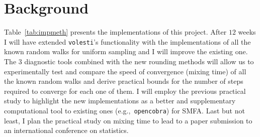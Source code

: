 \documentclass[a4paper, 12pt]{article}
\def\volesti{{\tt volesti}}
\begin{document}














\section{Background}

Table~\ref{tab:impmeth} presents the implementations of this project. After $12$ weeks I will have extended \volesti's functionality with the implementations of all the known random walks for uniform sampling and I will improve the existing one. The $3$ diagnostic tools combined with the new rounding methods will allow us to experimentally test and compare the speed of convergence (mixing time) of all the known random walks and derive practical bounds for the number of steps required to converge for each one of them. I will employ the previous practical study to highlight the new implementations as a better and supplementary computational tool to existing ones (e.g.,\ {\tt opencobra}) for SMFA. Last but not least, I plan the practical study on mixing time to lead to a paper submission to an international conference on statistics.
\end{document}
